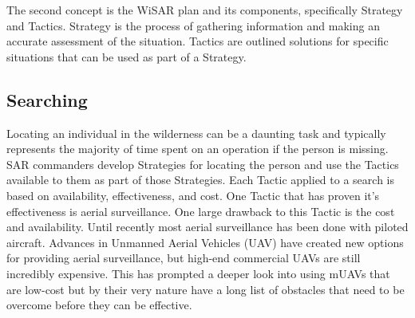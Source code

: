 The second concept is the WiSAR plan and its components, specifically Strategy
and Tactics.  Strategy is the process of gathering information and making an
accurate assessment of the situation.  Tactics are outlined solutions for
specific situations that can be used as part of a Strategy.



\subsection{Searching}
Locating an individual in the wilderness can be a daunting task and typically
represents the majority of time spent on an operation if the person is missing.
SAR commanders develop Strategies for locating the person and use the Tactics
available to them as part of those Strategies.  Each Tactic applied to a search
is based on availability, effectiveness, and cost.  One Tactic that has proven
it's effectiveness is aerial surveillance.  One large drawback to this Tactic is
the cost and availability.  Until recently most aerial surveillance has been
done with piloted aircraft.  Advances in Unmanned Aerial Vehicles (UAV) have
created new options for providing aerial surveillance, but high-end
commercial UAVs are still incredibly expensive.  This has prompted a deeper
look into using mUAVs that are low-cost but by their very nature have a long
list of obstacles that need to be overcome before they can be effective.

